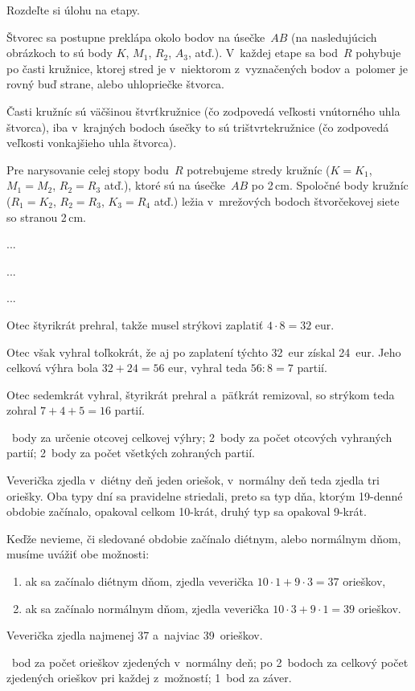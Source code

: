 {%
\napad
Rozdeľte si úlohu na etapy.

\riesenie
Štvorec sa postupne preklápa okolo bodov na úsečke~$AB$ (na nasledujúcich obrázkoch to sú body $K$, $M_1$, $R_2$, $A_3$, atď.).
V~každej etape sa bod~$R$ pohybuje po časti kružnice, ktorej stred je v~niektorom z~vyznačených bodov a~polomer je rovný buď strane, alebo uhlopriečke štvorca.
%


Časti kružníc sú väčšinou štvrťkružnice (čo zodpovedá veľkosti vnútorného uhla štvorca), iba v~krajných bodoch úsečky to sú trištvrtekružnice (čo zodpovedá veľkosti vonkajšieho uhla štvorca).

Pre narysovanie celej stopy bodu~$R$ potrebujeme stredy kružníc ($K=K_1$, $M_1=M_2$, $R_2=R_3$ atď.), ktoré sú na úsečke~$AB$ po 2\,cm.
Spoločné body kružníc ($R_1=K_2$, $R_2=R_3$, $K_3=R_4$ atď.) ležia v~mrežových bodoch štvorčekovej siete so stranou 2\,cm.
%
}

{%
...}

{%
...}

{%
...}

{%
Otec štyrikrát prehral, takže musel strýkovi zaplatiť $4\cdot8=32$ eur.

Otec však vyhral toľkokrát, že aj po zaplatení týchto 32~eur získal 24~eur.
Jeho celková výhra bola $32+24=56$ eur, vyhral teda $56:8=7$ partií.

Otec sedemkrát vyhral, štyrikrát prehral a~päťkrát remizoval, so strýkom teda zohral $7+4+5=16$ partií.

~body za určenie otcovej celkovej výhry;
2~body za počet otcových vyhraných partií;
2~body za počet všetkých zohraných partií.
\endhodnotenie
}

{%
Veverička zjedla v~diétny deň jeden oriešok, v~normálny deň teda zjedla tri oriešky.
Oba typy dní sa pravidelne striedali, preto sa typ dňa, ktorým 19-denné obdobie začínalo,
opakoval celkom 10-krát, druhý typ sa opakoval 9-krát.

Keďže nevieme, či sledované obdobie začínalo diétnym, alebo normálnym dňom, musíme uvážiť obe možnosti:
\begin{enumerate}\alphatrue
\item ak sa začínalo diétnym dňom, zjedla veverička $10\cdot1+9\cdot3=37$ orieškov,
\item ak sa začínalo normálnym dňom, zjedla veverička $10\cdot3+9\cdot1=39$ orieškov.
\end{enumerate}

Veverička zjedla najmenej 37 a~najviac 39~orieškov.

~bod za počet orieškov zjedených v~normálny deň;
po 2~bodoch za celkový počet zjedených orieškov pri každej z~možností;
1~bod za záver.
\endhodnotenie
}

